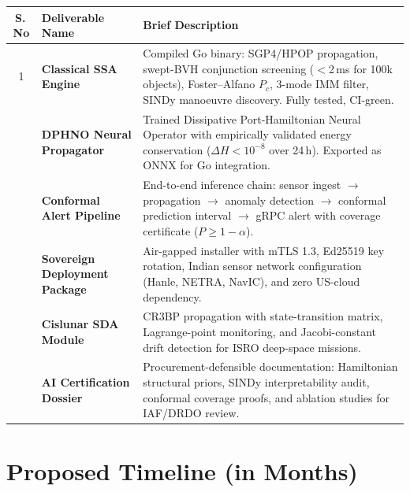 \documentclass[11pt,a4paper]{article}
\begin{document}
\renewcommand{\arraystretch}{1.35}
\begin{tabularx}{\textwidth}{c >{\bfseries}l Y}
\toprule
\textbf{S.\,No} & \textbf{Deliverable Name} & \textbf{Brief Description} \\
 & Classical SSA Engine &
Compiled Go binary: SGP4/HPOP propagation, swept-BVH conjunction
screening ($<$2\,ms for 100k objects), Foster--Alfano $P_c$, 3-mode IMM
filter, SINDy manoeuvre discovery. Fully tested, CI-green. \\
 & DPHNO Neural Propagator &
Trained Dissipative Port-Hamiltonian Neural Operator with empirically
validated energy conservation ($\Delta H < 10^{-8}$ over 24\,h).
Exported as ONNX for Go integration. \\
 & Conformal Alert Pipeline &
End-to-end inference chain: sensor ingest $\to$ propagation $\to$
anomaly detection $\to$ conformal prediction interval $\to$ gRPC alert
with coverage certificate ($P \geq 1-\alpha$). \\
 & Sovereign Deployment Package &
Air-gapped installer with mTLS 1.3, Ed25519 key rotation, Indian sensor
network configuration (Hanle, NETRA, NavIC), and zero US-cloud dependency. \\
 & Cislunar SDA Module &
CR3BP propagation with state-transition matrix, Lagrange-point monitoring,
and Jacobi-constant drift detection for ISRO deep-space missions. \\
 & AI Certification Dossier &
Procurement-defensible documentation: Hamiltonian structural priors,
SINDy interpretability audit, conformal coverage proofs, and ablation
studies for IAF/DRDO review. \\
\bottomrule
\end{tabularx}

\section{Proposed Timeline (in Months)}
\end{document}
